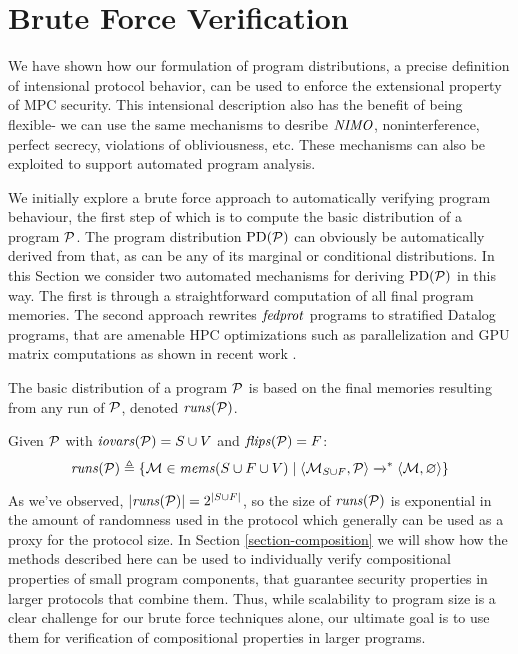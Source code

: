 \section{Brute Force Verification}
\label{section-bruteforce}

We have shown how our formulation of program distributions, a precise
definition of intensional protocol behavior, can be used to enforce
the extensional property of MPC security. This intensional description
also has the benefit of being flexible- we can use the same mechanisms
to desribe $\mathit{NIMO}$, noninterference, perfect secrecy, violations of
obliviousness, etc. These mechanisms can also be exploited to support
automated program analysis.

We initially explore a brute force approach to automatically verifying
program behaviour, the first step of which is to compute the basic
distribution of a program $\mathcal{P}$. The program distribution
$\mathrm{PD}(\mathcal{P})$ can obviously be automatically derived from that, as
can be any of its marginal or conditional distributions. In this
Section we consider two automated mechanisms for deriving
$\mathrm{PD}(\mathcal{P})$ in this way. The first is through a straightforward
computation of all final program memories.  The second approach
rewrites $\mathit{fedprot}$ programs to stratified Datalog programs, that are
amenable HPC optimizations such as parallelization and GPU matrix
computations as shown in recent work \cite{XXX}.

The basic distribution of a program $\mathcal{P}$ is based on the
final memories resulting from any run of $\mathcal{P}$, denoted
$\mathit{runs}(\mathcal{P})$.
\begin{definition}
  Given $\mathcal{P}$ with $\mathit{iovars}(\mathcal{P}) = S \cup V$ and $\mathit{flips}(\mathcal{P}) = F$:
  $$
  \mathit{runs}(\mathcal{P}) \triangleq \{ \mathcal{M} \in \mathit{mems}(S\cup F \cup V) \mid \langle \mathcal{M}_{S \cup F},\mathcal{P} \rangle \xrightarrow{}^{*} \langle \mathcal{M},\varnothing \rangle \}
  $$
\end{definition}
As we've observed, $|\mathit{runs}(\mathcal{P})| = 2^{|S \cup F|}$, so the size of
$\mathit{runs}(\mathcal{P})$ is exponential in the amount of randomness used in the
protocol which generally can be used as a proxy for the protocol
size. In Section \ref{section-composition} we will show how the
methods described here can be used to individually verify
compositional properties of small program components, that guarantee
security properties in larger protocols that combine them. Thus, while
scalability to program size is a clear challenge for our brute force
techniques alone, our ultimate goal is to use them for verification of
compositional properties in larger programs.

